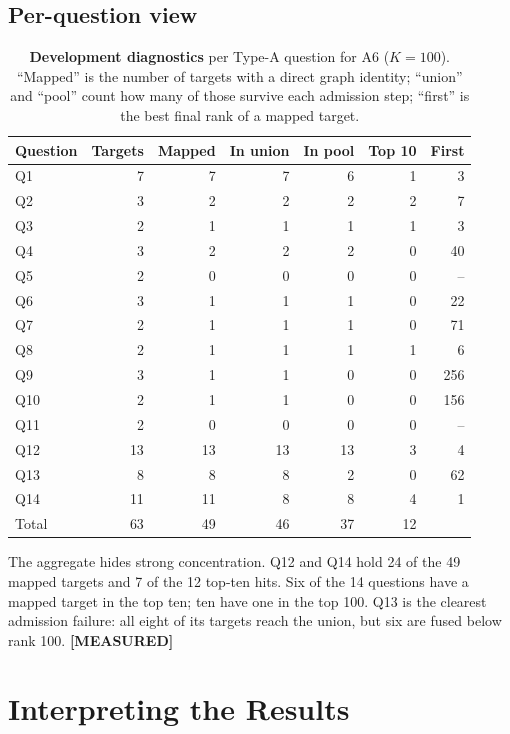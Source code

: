 \documentclass[11pt,a4paper]{article}
\theoremstyle{remark}
\newcommand{\vtag}[2]{{\sffamily\scriptsize\bfseries\textcolor{#1}{[#2]}}}
\newcommand{\Mtag}{\vtag{measgreen}{MEASURED}}
\begin{document}
\subsection{Per-question view}

\begin{table}[!htbp]
\centering
\caption[Per-question results (development diagnostics)]{\textbf{Development diagnostics} per Type-A question for A6 ($K=100$). ``Mapped''
is the number of targets with a direct graph identity; ``union'' and ``pool'' count how
many of those survive each admission step; ``first'' is the best final rank of a mapped
target.}
\label{tab:per-question}
\small
\begin{tabular}{lrrrrrr}
\toprule
Question & Targets & Mapped & In union & In pool & Top 10 & First\\
\midrule
Q1 & 7 & 7 & 7 & 6 & 1 & 3\\
Q2 & 3 & 2 & 2 & 2 & 2 & 7\\
Q3 & 2 & 1 & 1 & 1 & 1 & 3\\
Q4 & 3 & 2 & 2 & 2 & 0 & 40\\
Q5 & 2 & 0 & 0 & 0 & 0 & --\\
Q6 & 3 & 1 & 1 & 1 & 0 & 22\\
Q7 & 2 & 1 & 1 & 1 & 0 & 71\\
Q8 & 2 & 1 & 1 & 1 & 1 & 6\\
Q9 & 3 & 1 & 1 & 0 & 0 & 256\\
Q10 & 2 & 1 & 1 & 0 & 0 & 156\\
Q11 & 2 & 0 & 0 & 0 & 0 & --\\
Q12 & 13 & 13 & 13 & 13 & 3 & 4\\
Q13 & 8 & 8 & 8 & 2 & 0 & 62\\
Q14 & 11 & 11 & 8 & 8 & 4 & 1\\
\midrule
Total & 63 & 49 & 46 & 37 & 12 & \\
\bottomrule
\end{tabular}
\end{table}

The aggregate hides strong concentration. Q12 and Q14 hold 24 of the 49 mapped targets
and 7 of the 12 top-ten hits. Six of the 14 questions have a mapped target in the top ten;
ten have one in the top 100. Q13 is the clearest admission failure: all eight of its
targets reach the union, but six are fused below rank 100. \Mtag

\section{Interpreting the Results}
\label{sec:interpretation}
\end{document}
